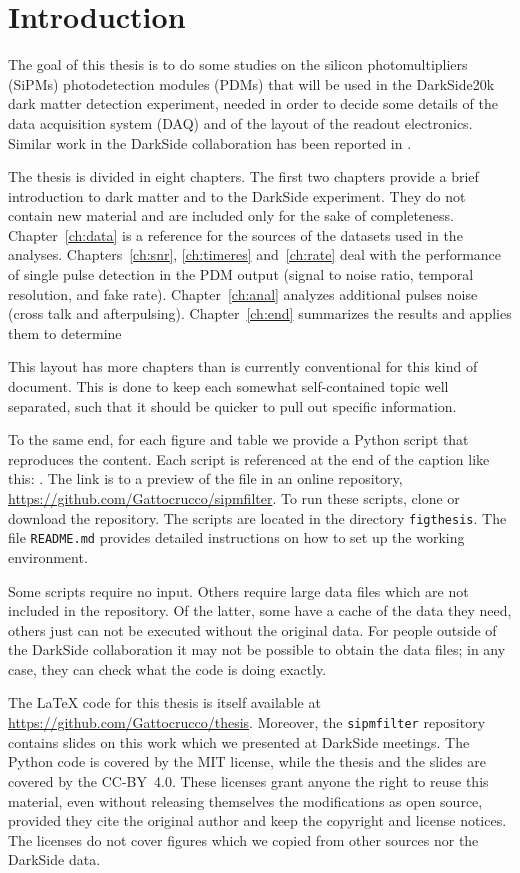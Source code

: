 \chapter*{Introduction}

The goal of this thesis is to do some studies on the silicon photomultipliers
(SiPMs) photodetection modules (PDMs) that will be used in the DarkSide20k dark
matter detection experiment, needed in order to decide some details of the data
acquisition system (DAQ) and of the layout of the readout electronics. Similar
work in the DarkSide collaboration has been reported in \cite[chapters~3
and~5]{savarese2018}.


The thesis is divided in eight chapters. The first two chapters provide a brief
introduction to dark matter and to the DarkSide experiment. They do not contain
new material and are included only for the sake of completeness.
Chapter~\ref{ch:data} is a reference for the sources of the datasets used in
the analyses. Chapters~\ref{ch:snr}, \ref{ch:timeres} and~\ref{ch:rate} deal
with the performance of single pulse detection in the PDM output (signal to
noise ratio, temporal resolution, and fake rate). Chapter~\ref{ch:anal}
analyzes additional pulses noise (cross talk and afterpulsing).
Chapter~\ref{ch:end} summarizes the results and applies them to determine

This layout has more chapters than is currently conventional for this kind of
document. This is done to keep each somewhat self-contained topic well
separated, such that it should be quicker to pull out specific information.

To the same end, for each figure and table we provide a Python script that
reproduces the content. Each script is referenced at the end of the caption
like this: . The link is to a preview of the file in an
online repository, \url{https://github.com/Gattocrucco/sipmfilter}. To run
these scripts, clone or download the repository. The scripts are located in the
directory \nolinkurl{figthesis}. The file \nolinkurl{README.md} provides
detailed instructions on how to set up the working environment.

Some scripts require no input. Others require large data files which are not
included in the repository. Of the latter, some have a cache of the data they
need, others just can not be executed without the original data. For people
outside of the DarkSide collaboration it may not be possible to obtain the data
files; in any case, they can check what the code is doing exactly.

The \LaTeX{} code for this thesis is itself available at
\url{https://github.com/Gattocrucco/thesis}. Moreover, the
\nolinkurl{sipmfilter} repository contains slides on this work which we
presented at DarkSide meetings. The Python code is covered by the MIT license,
while the thesis and the slides are covered by the CC-BY~4.0. These licenses
grant anyone the right to reuse this material, even without releasing
themselves the modifications as open source, provided they cite the original
author and keep the copyright and license notices. The licenses do not cover
figures which we copied from other sources nor the DarkSide data.
